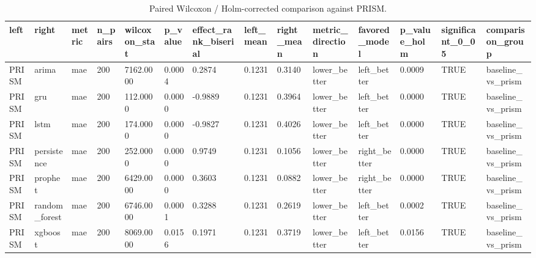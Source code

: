 \begin{table}[htbp]
\centering
\begin{tabular}{llllllllllllll}
\hline
left & right & metric & n_pairs & wilcoxon_stat & p_value & effect_rank_biserial & left_mean & right_mean & metric_direction & favored_model & p_value_holm & significant_0_05 & comparison_group \\
\hline
PRISM & arima & mae & 200 & 7162.0000 & 0.0004 & 0.2874 & 0.1231 & 0.3140 & lower_better & left_better & 0.0009 & TRUE & baseline_vs_prism \\
PRISM & gru & mae & 200 & 112.0000 & 0.0000 & -0.9889 & 0.1231 & 0.3964 & lower_better & left_better & 0.0000 & TRUE & baseline_vs_prism \\
PRISM & lstm & mae & 200 & 174.0000 & 0.0000 & -0.9827 & 0.1231 & 0.4026 & lower_better & left_better & 0.0000 & TRUE & baseline_vs_prism \\
PRISM & persistence & mae & 200 & 252.0000 & 0.0000 & 0.9749 & 0.1231 & 0.1056 & lower_better & right_better & 0.0000 & TRUE & baseline_vs_prism \\
PRISM & prophet & mae & 200 & 6429.0000 & 0.0000 & 0.3603 & 0.1231 & 0.0882 & lower_better & right_better & 0.0000 & TRUE & baseline_vs_prism \\
PRISM & random_forest & mae & 200 & 6746.0000 & 0.0001 & 0.3288 & 0.1231 & 0.2619 & lower_better & left_better & 0.0002 & TRUE & baseline_vs_prism \\
PRISM & xgboost & mae & 200 & 8069.0000 & 0.0156 & 0.1971 & 0.1231 & 0.3719 & lower_better & left_better & 0.0156 & TRUE & baseline_vs_prism \\
\hline
\end{tabular}
\caption{Paired Wilcoxon / Holm-corrected comparison against PRISM.}
\label{table_significance_vs_prism}
\end{table}